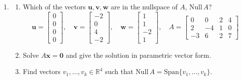 \documentclass[12pt,a4paper]{exam}
\newcommand{\bo}{\mathbf{0}}
\newcommand{\bu}{\mathbf{u}}
\newcommand{\bv}{\mathbf{v}}
\newcommand{\bw}{\mathbf{w}}
\newcommand{\bx}{\mathbf{x}}
\newcommand{\R}{\mathbb{R}}
\newcommand{\Nul}{\mathrm{Null\,}}
\newcommand{\Span}{\mathrm{Span}}
\begin{document}
\begin{enumerate}
\begin{solution}
\begin{enumerate}
  \end{enumerate}
\end{solution}



\item\label{mat12}
\begin{enumerate}
\item Which of the vectors $\bu,\bv,\bw$ are in the nullspace of $A$, $\Nul A$?
\[ 
\bu = \left[\begin{matrix} 0 \\ 0 \\ 0 \\ 0 \end{matrix}\right], \quad
\bv = \left[\begin{matrix} -2 \\ 0 \\ 4 \\ -2 \end{matrix}\right], \quad
\bw = \left[\begin{matrix} 1 \\ 1 \\ -2 \\ 1 \end{matrix}\right], \quad
A = \left[ \begin{matrix}
 0 & 0 & 2 & 4 \\
 2 & -4 & 1 & 0 \\
 -3 & 6 & 2 & 7
 \end{matrix} \right] \]

\item  Solve $A\bx=\bo$ and give the solution in parametric vector form.

\item  Find vectors $v_1,\dots,v_k \in \R^4$ such that $\Nul A = \Span\{ v_1,\dots,v_k \}$.
\end{enumerate}



\end{enumerate}
\end{document}
